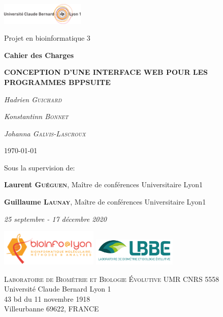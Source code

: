 \begin{titlepage}
	\centering
	\includegraphics[width=0.3\textwidth]{fig/lyon1.png}\par
	\vspace{0.1cm}
	{\normalsize Projet en bioinformatique 3\par}  
	\vspace{0.5cm}
	{\large\bfseries Cahier des Charges\par}
	{\large\bfseries CONCEPTION D'UNE INTERFACE WEB POUR LES PROGRAMMES BPPSUITE\par}
	\vspace{0.4cm}
	{\normalsize\itshape Hadrien \textsc{Guichard}\par}
	{\normalsize\itshape Konstantinn \textsc{Bonnet}\par}
	{\normalsize\itshape Johanna \textsc{Galvis-Lascroux}\par}
	\vfill
	{\large\today \par}  %
	\vfill
	Sous la supervision de:\par
	\textbf{Laurent \textsc{Guéguen}}, Maître de conférences Universitaire Lyon1\par
	\textbf{Guillaume \textsc{Launay}}, Maître de conférences Universitaire Lyon1\par
	\vspace{0.4cm}
	{\small\itshape 25 septembre - 17 décembre 2020\par}
	\vfill
	\includegraphics[width=0.35\textwidth]{fig/bioinfo.png}
	\hfill
	\includegraphics[width=0.3\textwidth]{fig/lbbe_new2.png}\par
	\vspace{0.5cm}
	\begin{minipage}{\linewidth}
		\centering
		\small
		\textsc{Laboratoire de Biométrie et Biologie Évolutive UMR CNRS 5558}\\
		Université Claude Bernard Lyon 1\\
		43 bd du 11 novembre 1918\\
		Villeurbanne 69622, FRANCE
		
	\end{minipage}
\end{titlepage}
